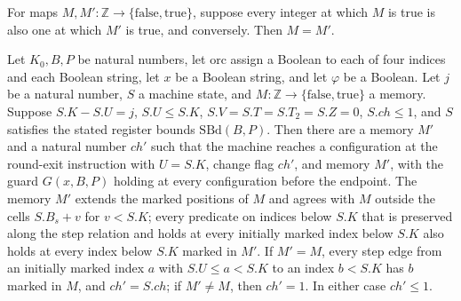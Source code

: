 \begin{lemma}
\label{Complexity.LogProg.ExpBFS.mono_antisymm}
\leanok
{}
For maps $M,M' : \mathbb{Z} \to \{\mathrm{false},\mathrm{true}\}$, suppose every integer
at which $M$ is true is also one at which $M'$ is true, and conversely. Then $M=M'$.
\end{lemma}

\begin{theorem}
\label{Complexity.LogProg.ExpBFS.outer_run}
\leanok
{}
Let $K_0,B,P$ be natural numbers, let $\mathrm{orc}$ assign a Boolean to each of four
indices and each Boolean string, let $x$ be a Boolean string, and let $\varphi$ be a
Boolean. Let $j$ be a natural number, $S$ a machine state, and
$M:\mathbb{Z}\to\{\mathrm{false},\mathrm{true}\}$ a memory. Suppose $S.K-S.U=j$, $S.U\le
S.K$, $S.V=S.T=S.T_2=S.Z=0$, $S.ch\le1$, and $S$ satisfies the stated register bounds
$\mathrm{SBd}(B,P)$. Then there are a memory $M'$ and a natural number $ch'$ such that
the machine reaches a configuration at the round-exit instruction with $U=S.K$, change
flag $ch'$, and memory $M'$, with the guard $G(x,B,P)$ holding at every configuration
before the endpoint. The memory $M'$ extends the marked positions of $M$ and agrees with
$M$ outside the cells $S.B_s+v$ for $v<S.K$; every predicate on indices below $S.K$ that
is preserved along the step relation and holds at every initially marked index below
$S.K$ also holds at every index below $S.K$ marked in $M'$. If $M'=M$, every step edge
from an initially marked index $a$ with $S.U\le a<S.K$ to an index $b<S.K$ has $b$
marked in $M$, and $ch'=S.ch$; if $M'\ne M$, then $ch'=1$. In either case $ch'\le1$.
\end{theorem}
